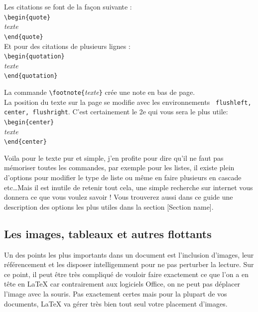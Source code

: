 \documentclass[11pt]{article}				%
\begin{document}
\begin{multicols}{2}


\noindent Les citations se font de la façon suivante : \\
\verb?\begin{quote}? \\
\emph{texte} \\
\verb?\end{quote}? \\

\noindent Et pour des citations de plusieurs lignes : \\
\verb?\begin{quotation}? \\
\emph{texte} \\
\verb?\end{quotation}? 

\columnbreak

\noindent La commande \verb?\footnote{?\emph{texte}\verb?}? crée une note en bas de page. \\


\noindent La position du texte sur la page se modifie avec les environnements \texttt{ flushleft, center,  flushright}. C'est certainement le 2e qui vous sera le plus utile: \\
\verb?\begin{center}? \\
\emph{texte}\\
\verb?\end{center}? 

\end{multicols}

Voila pour le texte pur et simple, j'en profite pour dire qu'il ne faut pas mémoriser toutes les commandes, par exemple pour les listes, il existe plein d'options pour modifier le type de liste ou même en faire plusieurs en cascade etc\dots Mais il est inutile de retenir tout cela, une simple recherche sur internet vous donnera ce que vous voulez savoir ! Vous trouverez aussi dans ce guide une description des options les plus utiles dans la section [Section name].

\subsection{Les images, tableaux et autres flottants}

Un des points les plus importants dans un document est l'inclusion d'images, leur référencement et les disposer intelligemment pour ne pas perturber la lecture. Sur ce point, il peut être très compliqué de vouloir faire exactement ce que l'on a en tête en LaTeX car contrairement aux logiciels Office, on ne peut pas déplacer l'image avec la souris.
Pas exactement certes mais pour la plupart de vos documents, LaTeX va gérer très bien tout seul votre placement d'images.\\
\end{document}

